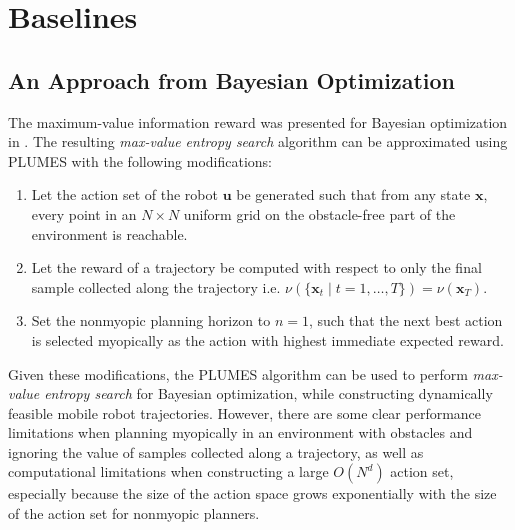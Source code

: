 \documentclass{styles/svproc}
\newcommand{\x}{\mathbf{x}}
\begin{document}

\section{Baselines}
\label{sec:baselines}
\subsection{An Approach from Bayesian Optimization}
\label{sec:wj}
The maximum-value information reward was presented for Bayesian optimization in \cite{wang2017max}. The resulting \textit{max-value entropy search} algorithm can be approximated using PLUMES with the following modifications:
\begin{enumerate}
    \item Let the action set of the robot $\mathbf{u}$ be generated such that from any state $\x$, every point in an $N \times N$ uniform grid on the obstacle-free part of the environment is reachable.
    \item Let the reward of a trajectory be computed with respect to only the final sample collected along the trajectory i.e. $\nu(\{\x_t \mid t = 1, \dots, T \}) = \nu(\x_T)$.
    \item Set the nonmyopic planning horizon to $n=1$, such that the next best action is selected myopically as the action with highest immediate expected reward. 
\end{enumerate}

Given these modifications, the PLUMES algorithm can be used to perform \textit{max-value entropy search} for Bayesian optimization, while constructing dynamically feasible mobile robot trajectories. However, there are some clear performance limitations when planning myopically in an environment with obstacles and ignoring the value of samples collected along a trajectory, as well as computational limitations when constructing a large $O(N^d)$ action set, especially because the size of the action space grows exponentially with the size of the action set for nonmyopic planners.
\end{document}

